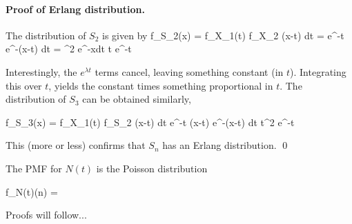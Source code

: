\paragraph{Proof of Erlang distribution.} The distribution of $S_2$ is given by
\bee
f_{S_2}(x) = \int f_{X_1}(t) f_{X_2} (x-t) dt = \int \lambda e^{-\lambda t} \lambda e^{-\lambda (x-t)} dt = \lambda^2 \int e^{-\lambda x}dt \propto t e^{-\lambda t}
\eee

Interestingly, the $e^{\lambda t}$ terms cancel, leaving something constant (in $t$). Integrating this over $t$, yields the constant times something proportional in $t$. The distribution of $S_3$ can be obtained similarly,

\bee
f_{S_3}(x) = \int f_{X_1}(t) f_{S_2} (x-t) dt \propto \int \lambda e^{-\lambda t} (x-t) e^{-\lambda (x-t)} dt \propto t^2 e^{-\lambda t}
\eee

This (more or less) confirms that $S_n$ has an Erlang distribution. \qed

The PMF for $N(t)$ is the Poisson distribution

\bee
f_{N(t)}(n) = 
\eee

Proofs will follow...


